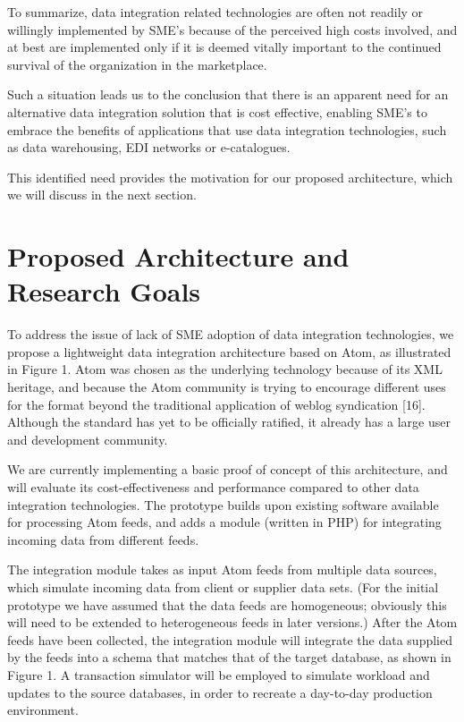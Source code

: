 \documentclass{CRPITStyle}
\begin{document}
To summarize, data integration related technologies are often not
readily or willingly implemented by SME's because of the perceived high
costs involved, and at best are implemented only if it is deemed vitally
important to the continued survival of the organization in the
marketplace.

Such a situation leads us to the conclusion that there is an apparent
need for an alternative data integration solution that is cost
effective, enabling SME's to embrace the benefits of applications that
use data integration technologies, such as data warehousing, EDI
networks or e-catalogues.

This identified need provides the motivation for our proposed
architecture, which we will discuss in the next section.

\section{Proposed Architecture and Research Goals}

To address the issue of lack of SME adoption of data integration
technologies, we propose a lightweight data integration architecture
based on Atom, as illustrated in Figure 1. Atom was chosen as the
underlying technology because of its XML heritage, and because the Atom
community is trying to encourage different uses for the format beyond
the traditional application of weblog syndication [16]. Although the
standard has yet to be officially ratified, it already has a large user
and development community.

We are currently implementing a basic proof of concept of this
architecture, and will evaluate its cost-effectiveness and performance
compared to other data integration technologies. The prototype builds
upon existing software available for processing Atom feeds, and adds a
module (written in PHP) for integrating incoming data from different
feeds.

The integration module takes as input Atom feeds from multiple data
sources, which simulate incoming data from client or supplier data sets.
(For the initial prototype we have assumed that the data feeds are
homogeneous; obviously this will need to be extended to heterogeneous
feeds in later versions.) After the Atom feeds have been collected, the
integration module will integrate the data supplied by the feeds into a
schema that matches that of the target database, as shown in Figure 1. A
transaction simulator will be employed to simulate workload and updates
to the source databases, in order to recreate a day-to-day production
environment.
\end{document}
